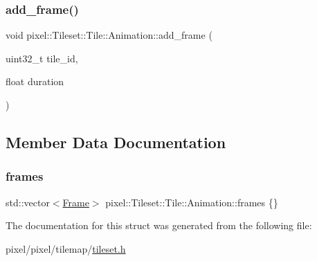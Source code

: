 \subsubsection{\texorpdfstring{add\+\_\+frame()}{add\_frame()}}
{\footnotesize\ttfamily void pixel\+::\+Tileset\+::\+Tile\+::\+Animation\+::add\+\_\+frame (\begin{DoxyParamCaption}\item[{uint32\+\_\+t}]{tile\+\_\+id,  }\item[{float}]{duration }\end{DoxyParamCaption})\hspace{0.3cm}{\ttfamily [inline]}}



\subsection{Member Data Documentation}
\mbox{\label{structpixel_1_1_tileset_1_1_tile_1_1_animation_aa7752cf4088a9a395a0e5e470c906205}} 
\subsubsection{\texorpdfstring{frames}{frames}}
{\footnotesize\ttfamily std\+::vector$<$\hyperlink{structpixel_1_1_tileset_1_1_tile_1_1_animation_1_1_frame}{Frame}$>$ pixel\+::\+Tileset\+::\+Tile\+::\+Animation\+::frames \{\}}



The documentation for this struct was generated from the following file\+:\begin{DoxyCompactItemize}
\item 
pixel/pixel/tilemap/\hyperlink{tileset_8h}{tileset.\+h}\end{DoxyCompactItemize}
